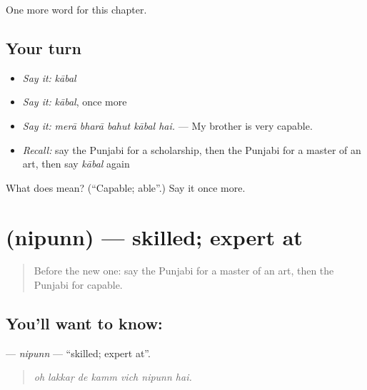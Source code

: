 \begin{grammarlens}[title={What you've built}]
One more word for this chapter.
\end{grammarlens}

\subsection*{Your turn}
\begin{itemize}
\raggedright
  \item \emph{Say it:} \emph{kābal}
  \item \emph{Say it:} \emph{kābal}, once more
  \item \emph{Say it:} \emph{merā bharā bahut kābal hai.} — My brother is very capable.
  \item \emph{Recall:} say the Punjabi for a scholarship, then the Punjabi for a master of an art, then say \emph{kābal} again
\end{itemize}

\begin{tcolorbox}[breakable,colback=teal!4,colframe=teal!35!black,title={Before you move on}]
What does  mean? (\textquotedblleft{}Capable; able\textquotedblright{}.) Say it once more.
\end{tcolorbox}
\section[\texorpdfstring{\pa{ਨਿਪੁੰਨ} (nipunn)}{ਨਿਪੁੰਨ (nipunn)}]{ (nipunn) — skilled; expert at}

\label{lesson:PA-C362-nipunn}



\begin{quote}
Before the new one: say the Punjabi for a master of an art, then the Punjabi for capable.
\end{quote}

\subsection*{You'll want to know: }
\textbf{} — \emph{nipunn} — \textquotedblleft{}skilled; expert at\textquotedblright{}.

\begin{quote}
      
\end{quote}

\begin{quote}
\emph{oh lakkaṛ de kamm vich nipunn hai.}
\end{quote}

